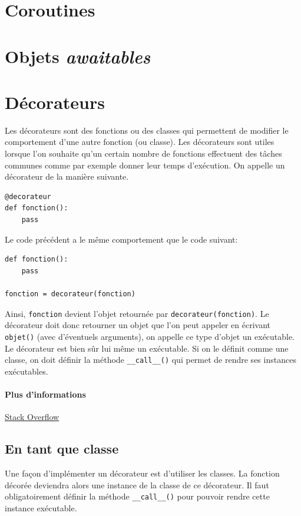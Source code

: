 \documentclass[a4paper, 10pt]{article}
\begin{document}
\section{Coroutines}
\section{Objets \emph{awaitables}}


\section{Décorateurs}
Les décorateurs sont des fonctions ou des classes qui permettent de modifier le comportement d'une autre fonction (ou classe). Les décorateurs sont utiles lorsque l'on souhaite qu'un certain nombre de fonctions effectuent des tâches communes comme par exemple donner leur temps d'exécution. On appelle un décorateur de la manière suivante.

\begin{verbatim}
@decorateur
def fonction():
    pass
\end{verbatim}

Le code précédent a le même comportement que le code suivant:

\begin{verbatim}
def fonction():
    pass

fonction = decorateur(fonction)
\end{verbatim}

Ainsi, \texttt{fonction} devient l'objet retournée par \texttt{decorateur(fonction)}. Le décorateur doit donc retourner un objet que l'on peut appeler en écrivant \texttt{objet()} (avec d'éventuels arguments), on appelle ce type d'objet un \og exécutable\fg{}. Le décorateur est bien sûr lui même un exécutable. Si on le définit comme une classe, on doit définir la méthode \texttt{__call__()} qui permet de rendre ses instances exécutables.

\paragraph{Plus d'informations} \href{https://stackoverflow.com/questions/739654/how-to-make-a-chain-of-function-decorators/1594484#1594484}{Stack Overflow}

\subsection{En tant que classe}
Une façon d'implémenter un décorateur est d'utiliser les classes. La fonction décorée deviendra alors une instance de la classe de ce décorateur. Il faut obligatoirement définir la méthode \texttt{__call__()} pour pouvoir rendre cette instance exécutable.
\end{document}
